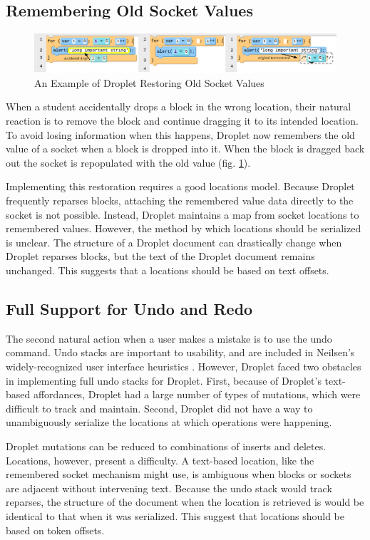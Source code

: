 \documentclass[conference]{IEEEtran}
\begin{document}
\subsection{Remembering Old Socket Values}

\begin{figure}
\centering
\includegraphics[width=5in]{remember-socket.png}
\caption{An Example of Droplet Restoring Old Socket Values}
\label{remember-socket}
\end{figure}

When a student accidentally drops a block in the wrong location, their natural reaction is to remove the block and continue dragging it to its intended location. To avoid losing information when this happens, Droplet now remembers the old value of a socket when a block is dropped into it. When the block is dragged back out the socket is repopulated with the old value (fig. \ref{remember-socket}).

Implementing this restoration requires a good locations model. Because Droplet frequently reparses blocks, attaching the remembered value data directly to the socket is not possible. Instead, Droplet maintains a map from socket locations to remembered values. However, the method by which locations should be serialized is unclear. The structure of a Droplet document can drastically change when Droplet reparses blocks, but the text of the Droplet document remains unchanged. This suggests that a locations should be based on text offsets.

\subsection{Full Support for Undo and Redo}
The second natural action when a user makes a mistake is to use the undo command. Undo stacks are important to usability, and are included in Neilsen's widely-recognized user interface heuristics \cite{Neilsen}. However, Droplet faced two obstacles in implementing full undo stacks for Droplet. First, because of Droplet's text-based affordances, Droplet had a large number of types of mutations, which were difficult to track and maintain. Second, Droplet did not have a way to unambiguously serialize the locations at which operations were happening.

Droplet mutations can be reduced to combinations of inserts and deletes. Locations, however, present a difficulty. A text-based location, like the remembered socket mechanism might use, is ambiguous when blocks or sockets are adjacent without intervening text. Because the undo stack would track reparses, the structure of the document when the location is retrieved is would be identical to that when it was serialized. This suggest that locations should be based on token offsets.
\end{document}
